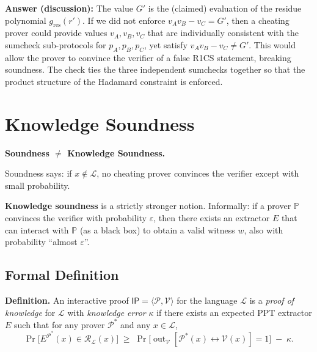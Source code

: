 \documentclass[11pt]{article}
\theoremstyle{plain}
\theoremstyle{definition}
\DeclareMathOperator{\out}{out}
\begin{document}
\medskip
\noindent\textbf{Answer (discussion):}  The value $G'$ is the (claimed) evaluation of the
residue polynomial $g_{\mathrm{res}}(r')$.  If we did not enforce $v_A v_B - v_C = G'$,
then a cheating prover could provide values $v_A, v_B, v_C$ that are individually
consistent with the sumcheck sub-protocols for $p_A, p_B, p_C$, yet satisfy
$v_A v_B - v_C \neq G'$.  This would allow the prover to convince the verifier of a false
R1CS statement, breaking soundness.  The check ties the three independent sumchecks
together so that the product structure of the Hadamard constraint is enforced.

\section{Knowledge Soundness}

\begin{importantbox}
  \textbf{Soundness $\neq$ Knowledge Soundness.}

  Soundness says: if $x \notin \mathcal{L}$, no cheating prover convinces the verifier
  except with small probability.

  \textbf{Knowledge soundness} is a strictly stronger notion.  Informally:
  if a prover $\mathbb{P}$ convinces the verifier with probability $\varepsilon$, then there
  exists an extractor $E$ that can interact with $\mathbb{P}$ (as a black box) to obtain a
  valid witness $w$, also with probability ``almost $\varepsilon$''.
\end{importantbox}

\subsection{Formal Definition}

\begin{definitionbox}
  \textbf{Definition.}  An interactive proof $\mathsf{IP} = \langle \mathcal{P}, \mathcal{V} \rangle$
  for the language $\mathcal{L}$ is a \emph{proof of knowledge} for $\mathcal{L}$ with
  \emph{knowledge error} $\kappa$ if there exists an expected PPT extractor $E$ such that
  for any prover $\mathcal{P}^*$ and any $x \in \mathcal{L}$,
  \[
    \Pr\bigl[E^{\mathcal{P}^*}(x) \in \mathcal{R}_{\mathcal{L}}(x)\bigr]
    \;\geq\;
    \Pr\bigl[\out_{\mathcal{V}}[\mathcal{P}^*(x) \leftrightarrow \mathcal{V}(x)] = 1\bigr]
    \;-\; \kappa.
  \]
\end{definitionbox}
\end{document}
